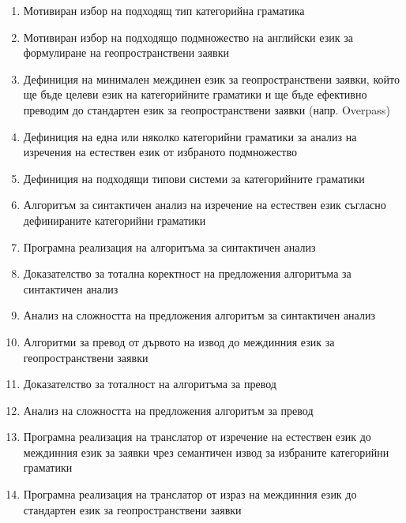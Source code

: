 \documentclass[11pt,a4paper]{article}
\begin{document}
\begin{enumerate}
\item Мотивиран избор на подходящ тип категорийна граматика
\item Мотивиран избор на подходящо подмножество на английски език за формулиране на геопространствени заявки
\item Дефиниция на минимален междинен език за геопространствени заявки, който ще бъде целеви език на категорийните граматики и ще бъде ефективно преводим до стандартен език за геопространствени заявки (напр. Overpass)
\item Дефиниция на една или няколко категорийни граматики за анализ на изречения на естествен език от избраното подмножество
\item Дефиниция на подходящи типови системи за категорийните граматики
\item Алгоритъм за синтактичен анализ на изречение на естествен език съгласно дефинираните категорийни граматики
\item Програмна реализация на алгоритъма за синтактичен анализ
\item Доказателство за тотална коректност на предложения алгоритъма за синтактичен анализ
\item Анализ на сложността на предложения алгоритъм за синтактичен анализ
\item Алгоритми за превод от дървото на извод до междинния език за геопространствени заявки
\item Доказателство за тоталност на алгоритъма за превод
\item Анализ на сложността на предложения алгоритъм за превод
\item Програмна реализация на транслатор от изречение на естествен език до междинния език за заявки чрез семантичен извод за избраните категорийни граматики
\item Програмна реализация на транслатор от израз на междинния език до стандартен език за геопространствени заявки
\end{enumerate}
\end{document}
